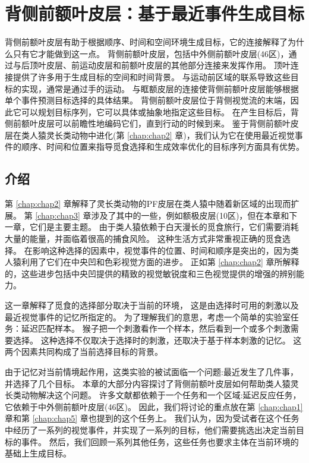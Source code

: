 \chapter{背侧前额叶皮层：基于最近事件生成目标} \label{chap:chap6}

背侧前额叶皮层有助于根据顺序、时间和空间环境生成目标，它的连接解释了为什么只有它才能做到这一点。
背侧前额叶皮层，包括中外侧前额叶皮层(46区)，通过与后顶叶皮层、前运动皮层和前额叶皮层的其他部分连接来发挥作用。
顶叶连接提供了许多用于生成目标的空间和时间背景。
与运动前区域的联系导致这些目标的实现，通常是通过手的运动。
与眶额皮层的连接使背侧前额叶皮层能够根据单个事件预测目标选择的具体结果。
背侧前额叶皮层位于背侧视觉流的末端，因此它可以规划目标序列，它可以具体或抽象地指定这些目标。
在产生目标后，背侧前额叶皮层可以前瞻性地编码它们，直到行动的时候到来。
鉴于背侧前额叶皮层在类人猿灵长类动物中进化(第 \ref{chap:chap2} 章)，我们认为它在使用最近视觉事件的顺序、时间和位置来指导觅食选择和生成效率优化的目标序列方面具有优势。



\section{介绍}

第 \ref{chap:chap2} 章解释了灵长类动物的PF皮层在类人猿中随着新区域的出现而扩展。
第 \ref{chap:chap3} 章涉及了其中的一些，例如额极皮层(10区)，但在本章和下一章，它们是主要主题。
由于类人猿依赖于白天漫长的觅食旅行，它们需要消耗大量的能量，并面临着很高的捕食风险。
这种生活方式非常重视正确的觅食选择。
在影响这种选择的因素中，视觉事件的位置、时间和顺序是突出的，因为类人猿利用了它们在中央凹和色彩视觉方面的进步。
正如第 \ref{chap:chap2} 章所解释的，这些进步包括中央凹提供的精致的视觉敏锐度和三色视觉提供的增强的辨别能力。


这一章解释了觅食的选择部分取决于当前的环境，
这是由选择时可用的刺激以及最近视觉事件的记忆所指定的。
为了理解我们的意思，考虑一个简单的实验室任务：延迟匹配样本。
猴子把一个刺激看作一个样本，然后看到一个或多个刺激需要选择。
这种选择不仅取决于选择时的刺激，还取决于基于样本刺激的记忆。
这两个因素共同构成了当前选择目标的背景。


由于记忆对当前情境起作用，这类实验的被试面临一个问题:最近发生了几件事，并选择了几个目标。
本章的大部分内容探讨了背侧前额叶皮层如何帮助类人猿灵长类动物解决这个问题。
许多文献都依赖于一个任务和一个区域:延迟反应任务，它依赖于中外侧前额叶皮层(46区)。
因此，我们将讨论的重点放在第 \ref{chap:chap1} 章和第 \ref{chap:chap5} 章也提到的这个任务上。
我们认为，因为受试者在这个任务中经历了一系列的视觉事件，并实现了一系列的目标，他们需要挑选出决定当前目标的事件。
然后，我们回顾一系列其他任务，这些任务也要求主体在当前环境的基础上生成目标。



